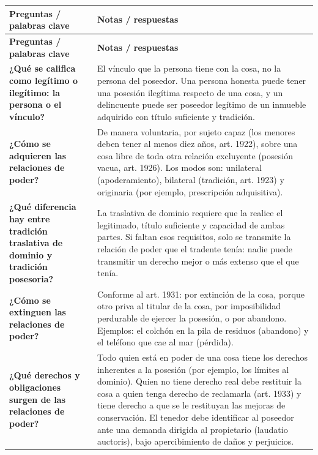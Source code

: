 \documentclass[12pt,oneside]{book}
\begin{document}
\begin{longtable}{@{}>{\raggedright\arraybackslash}p{}>{\raggedright\arraybackslash}p{}@{}}
\toprule
\textbf{Preguntas / palabras clave} & \textbf{Notas / respuestas} \\
\midrule
\endfirsthead
\toprule
\textbf{Preguntas / palabras clave} & \textbf{Notas / respuestas} \\
\midrule
\endhead

\textbf{¿Qué se califica como legítimo o ilegítimo: la persona o el vínculo?} &
El vínculo que la persona tiene con la cosa, no la persona del poseedor. Una persona honesta puede tener una posesión ilegítima respecto de una cosa, y un delincuente puede ser poseedor legítimo de un inmueble adquirido con título suficiente y tradición. \\
\midrule

\textbf{¿Cómo se adquieren las relaciones de poder?} &
De manera voluntaria, por sujeto capaz (los menores deben tener al menos diez años, art. 1922), sobre una cosa libre de toda otra relación excluyente (posesión vacua, art. 1926). Los modos son: unilateral (apoderamiento), bilateral (tradición, art. 1923) y originaria (por ejemplo, prescripción adquisitiva). \\
\midrule

\textbf{¿Qué diferencia hay entre tradición traslativa de dominio y tradición posesoria?} &
La traslativa de dominio requiere que la realice el legitimado, título suficiente y capacidad de ambas partes. Si faltan esos requisitos, solo se transmite la relación de poder que el tradente tenía: nadie puede transmitir un derecho mejor o más extenso que el que tenía. \\
\midrule

\textbf{¿Cómo se extinguen las relaciones de poder?} &
Conforme al art. 1931: por extinción de la cosa, porque otro priva al titular de la cosa, por imposibilidad perdurable de ejercer la posesión, o por abandono. Ejemplos: el colchón en la pila de residuos (abandono) y el teléfono que cae al mar (pérdida). \\
\midrule

\textbf{¿Qué derechos y obligaciones surgen de las relaciones de poder?} &
Todo quien está en poder de una cosa tiene los derechos inherentes a la posesión (por ejemplo, los límites al dominio). Quien no tiene derecho real debe restituir la cosa a quien tenga derecho de reclamarla (art. 1933) y tiene derecho a que se le restituyan las mejoras de conservación. El tenedor debe identificar al poseedor ante una demanda dirigida al propietario (laudatio auctoris), bajo apercibimiento de daños y perjuicios. \\
\midrule


\end{longtable}
\end{document}
